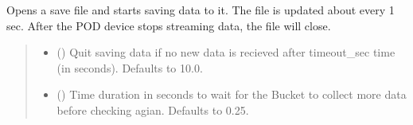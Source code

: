 \documentclass[letterpaper,10pt,english]{sphinxmanual}
\begin{document}
\begin{fulllineitems}
\begin{fulllineitems}
\begin{quote}
\begin{description}
\end{description}\end{quote}

\end{fulllineitems}


\begin{fulllineitems}
\label{\detokenize{PodApi.Stream:PodApi.Stream.DrainToFile.DrainBucket._ThreadedDrainBucketToFile}}
\pysigstartsignatures
{}
\pysigstopsignatures
\sphinxAtStartPar
Opens a save file and starts saving data to it. The file is updated about every 1 sec.         After the POD device stops streaming data, the file will close.
\begin{quote}\begin{description}
\begin{itemize}
\item {} 
\sphinxAtStartPar
{} (\sphinxstyleliteralemphasis{\sphinxupquote{, }}) \textendash{} Quit saving data if no new data is recieved                 after timeout\_sec time (in seconds). Defaults to 10.0.

\item {} 
\sphinxAtStartPar
{} (\sphinxstyleliteralemphasis{\sphinxupquote{, }}) \textendash{} Time duration in seconds to wait for the Bucket to                 collect more data before checking agian. Defaults to 0.25.

\end{itemize}

\end{description}\end{quote}

\end{fulllineitems}


\end{fulllineitems}
\end{document}
